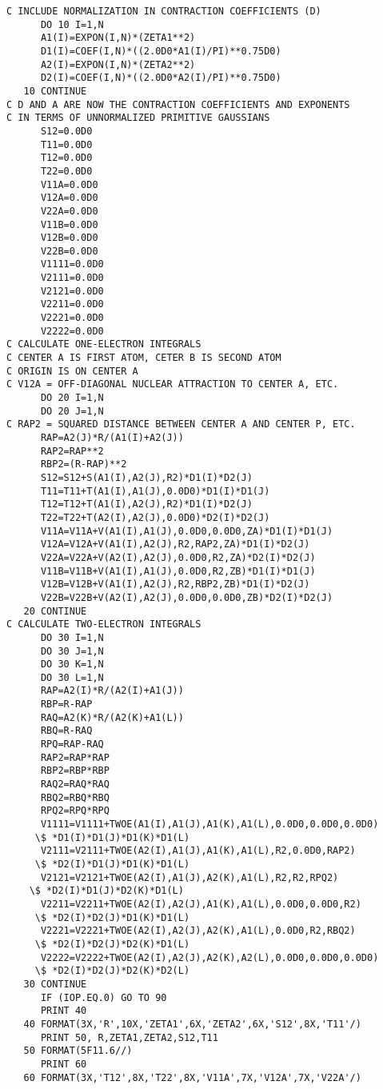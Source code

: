 \begin{verbatim}
C INCLUDE NORMALIZATION IN CONTRACTION COEFFICIENTS (D)
      DO 10 I=1,N
      A1(I)=EXPON(I,N)*(ZETA1**2)
      D1(I)=COEF(I,N)*((2.0D0*A1(I)/PI)**0.75D0)
      A2(I)=EXPON(I,N)*(ZETA2**2)
      D2(I)=COEF(I,N)*((2.0D0*A2(I)/PI)**0.75D0)
   10 CONTINUE
C D AND A ARE NOW THE CONTRACTION COEFFICIENTS AND EXPONENTS
C IN TERMS OF UNNORMALIZED PRIMITIVE GAUSSIANS
      S12=0.0D0
      T11=0.0D0
      T12=0.0D0
      T22=0.0D0
      V11A=0.0D0
      V12A=0.0D0
      V22A=0.0D0
      V11B=0.0D0
      V12B=0.0D0
      V22B=0.0D0
      V1111=0.0D0
      V2111=0.0D0
      V2121=0.0D0
      V2211=0.0D0
      V2221=0.0D0
      V2222=0.0D0
C CALCULATE ONE-ELECTRON INTEGRALS
C CENTER A IS FIRST ATOM, CETER B IS SECOND ATOM
C ORIGIN IS ON CENTER A
C V12A = OFF-DIAGONAL NUCLEAR ATTRACTION TO CENTER A, ETC.
      DO 20 I=1,N
      DO 20 J=1,N
C RAP2 = SQUARED DISTANCE BETWEEN CENTER A AND CENTER P, ETC.
      RAP=A2(J)*R/(A1(I)+A2(J))
      RAP2=RAP**2
      RBP2=(R-RAP)**2
      S12=S12+S(A1(I),A2(J),R2)*D1(I)*D2(J)
      T11=T11+T(A1(I),A1(J),0.0D0)*D1(I)*D1(J)
      T12=T12+T(A1(I),A2(J),R2)*D1(I)*D2(J)
      T22=T22+T(A2(I),A2(J),0.0D0)*D2(I)*D2(J)
      V11A=V11A+V(A1(I),A1(J),0.0D0,0.0D0,ZA)*D1(I)*D1(J)
      V12A=V12A+V(A1(I),A2(J),R2,RAP2,ZA)*D1(I)*D2(J)
      V22A=V22A+V(A2(I),A2(J),0.0D0,R2,ZA)*D2(I)*D2(J)
      V11B=V11B+V(A1(I),A1(J),0.0D0,R2,ZB)*D1(I)*D1(J)
      V12B=V12B+V(A1(I),A2(J),R2,RBP2,ZB)*D1(I)*D2(J)
      V22B=V22B+V(A2(I),A2(J),0.0D0,0.0D0,ZB)*D2(I)*D2(J)
   20 CONTINUE
C CALCULATE TWO-ELECTRON INTEGRALS
      DO 30 I=1,N
      DO 30 J=1,N
      DO 30 K=1,N
      DO 30 L=1,N
      RAP=A2(I)*R/(A2(I)+A1(J))
      RBP=R-RAP
      RAQ=A2(K)*R/(A2(K)+A1(L))
      RBQ=R-RAQ
      RPQ=RAP-RAQ
      RAP2=RAP*RAP
      RBP2=RBP*RBP
      RAQ2=RAQ*RAQ
      RBQ2=RBQ*RBQ
      RPQ2=RPQ*RPQ
      V1111=V1111+TWOE(A1(I),A1(J),A1(K),A1(L),0.0D0,0.0D0,0.0D0)
     \$ *D1(I)*D1(J)*D1(K)*D1(L)
      V2111=V2111+TWOE(A2(I),A1(J),A1(K),A1(L),R2,0.0D0,RAP2)
     \$ *D2(I)*D1(J)*D1(K)*D1(L)
      V2121=V2121+TWOE(A2(I),A1(J),A2(K),A1(L),R2,R2,RPQ2)
    \$ *D2(I)*D1(J)*D2(K)*D1(L)
      V2211=V2211+TWOE(A2(I),A2(J),A1(K),A1(L),0.0D0,0.0D0,R2)
     \$ *D2(I)*D2(J)*D1(K)*D1(L)
      V2221=V2221+TWOE(A2(I),A2(J),A2(K),A1(L),0.0D0,R2,RBQ2)
     \$ *D2(I)*D2(J)*D2(K)*D1(L)
      V2222=V2222+TWOE(A2(I),A2(J),A2(K),A2(L),0.0D0,0.0D0,0.0D0)
     \$ *D2(I)*D2(J)*D2(K)*D2(L)
   30 CONTINUE
      IF (IOP.EQ.0) GO TO 90
      PRINT 40
   40 FORMAT(3X,'R',10X,'ZETA1',6X,'ZETA2',6X,'S12',8X,'T11'/)
      PRINT 50, R,ZETA1,ZETA2,S12,T11
   50 FORMAT(5F11.6//)
      PRINT 60
   60 FORMAT(3X,'T12',8X,'T22',8X,'V11A',7X,'V12A',7X,'V22A'/)

\end{verbatim}
